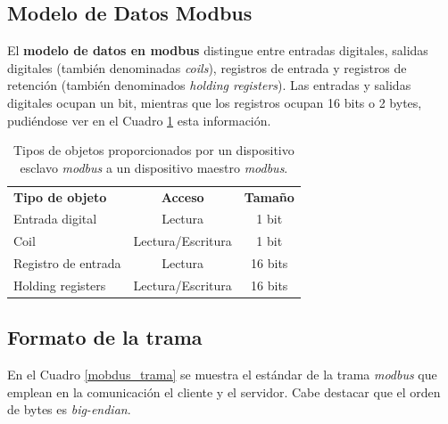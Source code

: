 \documentclass[pdftex,11pt,a4paper]{book}
\begin{document}
\subsection{Modelo de Datos Modbus}

El \textbf{modelo de datos en modbus} distingue entre entradas digitales, salidas digitales (también denominadas \textit{coils}), registros de entrada y registros de retención (también denominados \textit{holding registers}). Las entradas y salidas digitales ocupan un bit, mientras que los registros ocupan 16 bits o 2 bytes, pudiéndose ver en el Cuadro \ref{mobdus_tamanyo} esta información.


\begin{table}[htbp]
\begin{center}
\begin{tabular}{|lcc|}
\hline
	\textbf{Tipo de objeto} & \textbf{Acceso} & \textbf{Tamaño} \\
	Entrada digital & Lectura & 1 bit \\
	Coil & Lectura/Escritura & 1 bit \\
	Registro de entrada & Lectura & 16 bits \\
	Holding registers & Lectura/Escritura & 16 bits \\
\hline


\end{tabular}
\caption{Tipos de objetos proporcionados por un dispositivo esclavo \emph{modbus} a un dispositivo maestro \emph{modbus}.}
\label{mobdus_tamanyo}
\end{center}
\end{table}

\subsection{Formato de la trama}

En el Cuadro \ref{mobdus_trama} se muestra el estándar de la trama \emph{modbus} que emplean en la comunicación el cliente y el servidor. Cabe destacar que el orden de bytes es \emph{big-endian}.
\end{document}
